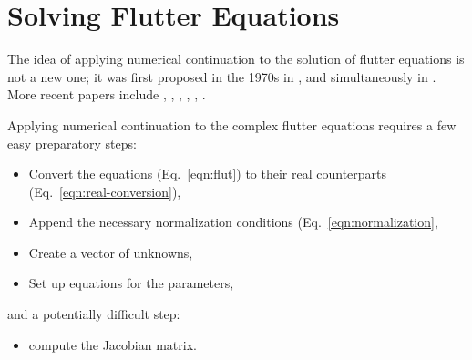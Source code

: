 \documentclass[10pt,openany,twoside]{book}
\numberwithin{equation}{section}   %
\newcommand{\Code}[1]{{\small\tt #1}}
\newcommand{\Eqn}[1]{Eq.\ \ref{#1}}
\begin{document}
% 
% 


\chapter{Solving Flutter Equations}\label{chap:application}

The idea of applying numerical continuation to the solution of
flutter equations is not a new one; it was first proposed in the 1970s in
\cite{cardani1978continuation}, and simultaneously in \cite{meyer1982aeroelastic}.
More recent papers include \cite{yu2020nonlinear}, \cite{meyer2016continuation}, 
\cite{meyer2015continuation}, \cite{meyer2014unified},
\cite{potkanski2008lco}, \cite{meyer1988application}.

Applying numerical continuation to the complex flutter
equations requires a few easy preparatory steps:
\begin{itemize}
	\item Convert the equations (\Eqn{eqn:flut}) to their real counterparts
		(\Eqn{eqn:real-conversion}),
	\item Append the necessary normalization conditions (\Eqn{eqn:normalization},
	\item Create a vector of unknowns,
	\item Set up equations for the parameters,
\end{itemize}
and a potentially difficult step:
\begin{itemize}
	\item compute the Jacobian matrix.
\end{itemize}
\end{document}
